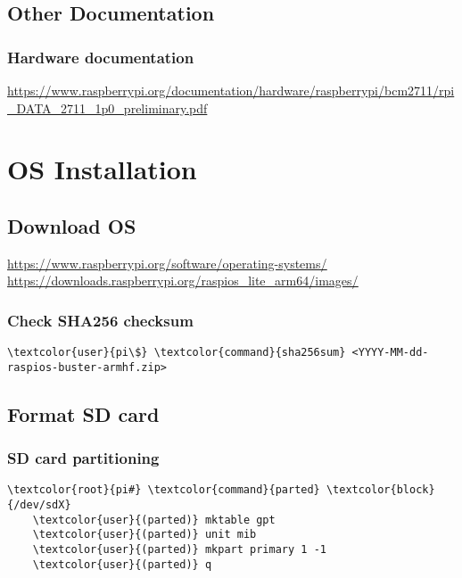\documentclass[10pt, a4paper, onecolumn, openany]{book} %
\begin{document}
\section{Other Documentation}
\subsection{Hardware documentation}
\url{https://www.raspberrypi.org/documentation/hardware/raspberrypi/bcm2711/rpi_DATA_2711_1p0_preliminary.pdf}


\chapter{OS Installation}
\section{Download OS}
\underline{\url{https://www.raspberrypi.org/software/operating-systems/}}\newline
\underline{\url{https://downloads.raspberrypi.org/raspios_lite_arm64/images/}}
\subsection{Check SHA256 checksum}
\begin{Verbatim}[commandchars=\\\{\}]
    \textcolor{user}{pi\$} \textcolor{command}{sha256sum} <YYYY-MM-dd-raspios-buster-armhf.zip>
\end{Verbatim}
\section{Format SD card}
\subsection{SD card partitioning}
\begin{Verbatim}[commandchars=\\\{\}]
    \textcolor{root}{pi#} \textcolor{command}{parted} \textcolor{block}{/dev/sdX}
    \textcolor{user}{(parted)} mktable gpt
    \textcolor{user}{(parted)} unit mib
    \textcolor{user}{(parted)} mkpart primary 1 -1
    \textcolor{user}{(parted)} q
\end{Verbatim}
\end{document}
